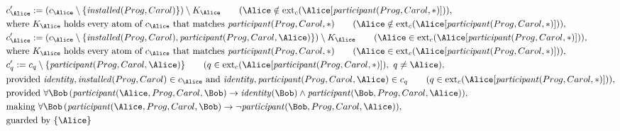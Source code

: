 \begin{align*}
&
c'_
{
\Alice
}
 := 
(c_
{
\Alice
}
 \setminus 
\{
\mathit{\detokenize{
installed
}}
(
Prog
,
Carol
)
\}
) \setminus K_
{
\Alice
}
 \qquad (
\Alice
 \notin 
\mathrm{ext}_c(
\Alice
[
\mathit{\detokenize{
participant
}}
(
Prog
,
Carol
,
\ast
)
]
)
)
,\\
&
\text{where } K_
{
\Alice
}
 \text{ holds every atom of } c_
{
\Alice
}
 \text{ that matches } 
\mathit{\detokenize{
participant
}}
(
Prog
,
Carol
,
\ast
)
 \qquad (
\Alice
 \notin 
\mathrm{ext}_c(
\Alice
[
\mathit{\detokenize{
participant
}}
(
Prog
,
Carol
,
\ast
)
]
)
)
,\\
&
c'_
{
\Alice
}
 := 
(c_
{
\Alice
}
 \setminus 
\{
\mathit{\detokenize{
installed
}}
(
Prog
,
Carol
)
,
\mathit{\detokenize{
participant
}}
(
Prog
,
Carol
,
\Alice
)
\}
) \setminus K_
{
\Alice
}
 \qquad (
\Alice
 \in 
\mathrm{ext}_c(
\Alice
[
\mathit{\detokenize{
participant
}}
(
Prog
,
Carol
,
\ast
)
]
)
)
,\\
&
\text{where } K_
{
\Alice
}
 \text{ holds every atom of } c_
{
\Alice
}
 \text{ that matches } 
\mathit{\detokenize{
participant
}}
(
Prog
,
Carol
,
\ast
)
 \qquad (
\Alice
 \in 
\mathrm{ext}_c(
\Alice
[
\mathit{\detokenize{
participant
}}
(
Prog
,
Carol
,
\ast
)
]
)
)
,\\
&
c'_
q
 := 
c_
q
 \setminus 
\{
\mathit{\detokenize{
participant
}}
(
Prog
,
Carol
,
\Alice
)
\}
 \qquad (
q
 \in 
\mathrm{ext}_c(
\Alice
[
\mathit{\detokenize{
participant
}}
(
Prog
,
Carol
,
\ast
)
]
)
,\ 
q \neq 
\Alice
)
,\\
&
\text{provided } 
\mathit{\detokenize{
identity
}}
,
\mathit{\detokenize{
installed
}}
(
Prog
,
Carol
)
 \in c_
{
\Alice
}
 \text{ and } 
\mathit{\detokenize{
identity
}}
,
\mathit{\detokenize{
participant
}}
(
Prog
,
Carol
,
\Alice
)
 \in c_
q
 \qquad (
q \in 
\mathrm{ext}_c(
\Alice
[
\mathit{\detokenize{
participant
}}
(
Prog
,
Carol
,
\ast
)
]
)
)
,\\
&
\text{provided } 
\forall 
\Bob
\,(
\mathit{\detokenize{
participant
}}
(
\Alice
,
Prog
,
Carol
,
\Bob
)
\rightarrow
\mathit{\detokenize{
identity
}}
(
\Bob
)
\land
\mathit{\detokenize{
participant
}}
(
\Bob
,
Prog
,
Carol
,
\Alice
)
)
,\\
&
\text{making } 
\forall 
\Bob
\,(
\mathit{\detokenize{
participant
}}
(
\Alice
,
Prog
,
Carol
,
\Bob
)
\rightarrow
\neg 
\mathit{\detokenize{
participant
}}
(
\Bob
,
Prog
,
Carol
,
\Alice
)
)
,\\
&
\text{guarded by } \{
\Alice
\}
\end{align*}
